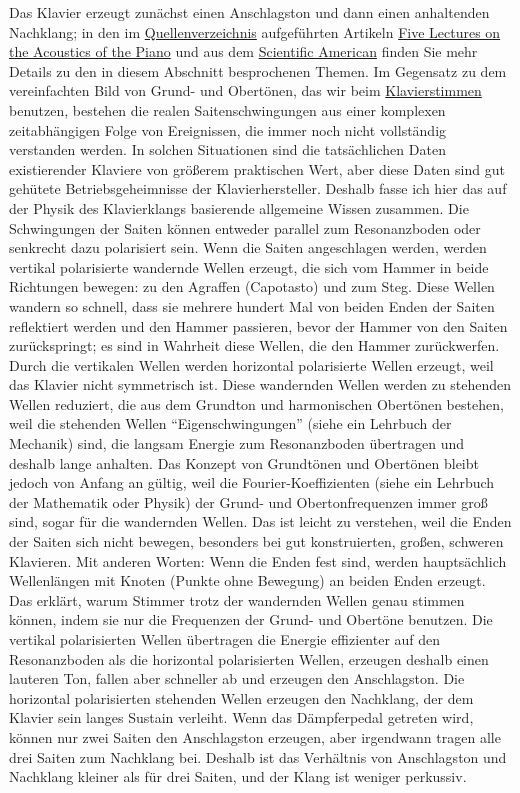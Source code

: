 Das Klavier erzeugt zunächst einen Anschlagston und dann einen anhaltenden Nachklang;
in den im \hyperref[reference]{Quellenverzeichnis} aufgeführten Artikeln \hyperref[Lectures]{Five Lectures on the Acoustics of the Piano} und aus dem \hyperref[American]{Scientific American} finden Sie mehr Details zu den in diesem Abschnitt besprochenen Themen.
Im Gegensatz zu dem vereinfachten Bild von Grund- und Obertönen, das wir beim \hyperref[c2_1]{Klavierstimmen} benutzen, bestehen die realen Saitenschwingungen aus einer komplexen zeitabhängigen Folge von Ereignissen, die immer noch nicht vollständig verstanden werden.
In solchen Situationen sind die tatsächlichen Daten existierender Klaviere von größerem praktischen Wert, aber diese Daten sind gut gehütete Betriebsgeheimnisse der Klavierhersteller.
Deshalb fasse ich hier das auf der Physik des Klavierklangs basierende allgemeine Wissen zusammen.
Die Schwingungen der Saiten können entweder parallel zum Resonanzboden oder senkrecht dazu polarisiert sein.
Wenn die Saiten angeschlagen werden, werden vertikal polarisierte wandernde Wellen erzeugt, die sich vom Hammer in beide Richtungen bewegen: zu den Agraffen (Capotasto) und zum Steg.
Diese Wellen wandern so schnell, dass sie mehrere hundert Mal von beiden Enden der Saiten reflektiert werden und den Hammer passieren, bevor der Hammer von den Saiten zurückspringt;
es sind in Wahrheit diese Wellen, die den Hammer zurückwerfen.
Durch die vertikalen Wellen werden horizontal polarisierte Wellen erzeugt, weil das Klavier nicht symmetrisch ist.
Diese wandernden Wellen werden zu stehenden Wellen reduziert, die aus dem Grundton und harmonischen Obertönen bestehen, weil die stehenden Wellen \enquote{Eigenschwingungen} (siehe ein Lehrbuch der Mechanik) sind, die langsam Energie zum Resonanzboden übertragen und deshalb lange anhalten.
Das Konzept von Grundtönen und Obertönen bleibt jedoch von Anfang an gültig, weil die Fourier-Koeffizienten (siehe ein Lehrbuch der Mathematik oder Physik) der Grund- und Obertonfrequenzen immer groß sind, sogar für die wandernden Wellen.
Das ist leicht zu verstehen, weil die Enden der Saiten sich nicht bewegen, besonders bei gut konstruierten, großen, schweren Klavieren.
Mit anderen Worten: Wenn die Enden fest sind, werden hauptsächlich Wellenlängen mit Knoten (Punkte ohne Bewegung) an beiden Enden erzeugt.
Das erklärt, warum Stimmer trotz der wandernden Wellen genau stimmen können, indem sie nur die Frequenzen der Grund- und Obertöne benutzen.
Die vertikal polarisierten Wellen übertragen die Energie effizienter auf den Resonanzboden als die horizontal polarisierten Wellen, erzeugen deshalb einen lauteren Ton, fallen aber schneller ab und erzeugen den Anschlagston.
Die horizontal polarisierten stehenden Wellen erzeugen den Nachklang, der dem Klavier sein langes Sustain verleiht.
Wenn das Dämpferpedal getreten wird, können nur zwei Saiten den Anschlagston erzeugen, aber irgendwann tragen alle drei Saiten zum Nachklang bei.
Deshalb ist das Verhältnis von Anschlagston und Nachklang kleiner als für drei Saiten, und der Klang ist weniger perkussiv.

